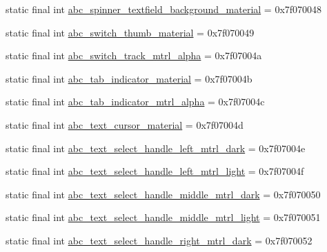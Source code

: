 \begin{DoxyCompactItemize}
static final int \mbox{\hyperlink{classandroid_1_1support_1_1design_1_1R_1_1drawable_a46a7523b2bf448075a84dea597735916}{abc\+\_\+spinner\+\_\+textfield\+\_\+background\+\_\+material}} = 0x7f070048
\item 
static final int \mbox{\hyperlink{classandroid_1_1support_1_1design_1_1R_1_1drawable_a3a7eda576b66b008b9973477103ad769}{abc\+\_\+switch\+\_\+thumb\+\_\+material}} = 0x7f070049
\item 
static final int \mbox{\hyperlink{classandroid_1_1support_1_1design_1_1R_1_1drawable_a2c00fcab8bac6c66dbe2d1a34992f941}{abc\+\_\+switch\+\_\+track\+\_\+mtrl\+\_\+alpha}} = 0x7f07004a
\item 
static final int \mbox{\hyperlink{classandroid_1_1support_1_1design_1_1R_1_1drawable_a1df6dff38e80904864f9d1b16188e4b0}{abc\+\_\+tab\+\_\+indicator\+\_\+material}} = 0x7f07004b
\item 
static final int \mbox{\hyperlink{classandroid_1_1support_1_1design_1_1R_1_1drawable_a7e95b663c60c56e55380a5750cbaf5e3}{abc\+\_\+tab\+\_\+indicator\+\_\+mtrl\+\_\+alpha}} = 0x7f07004c
\item 
static final int \mbox{\hyperlink{classandroid_1_1support_1_1design_1_1R_1_1drawable_ab7d0879432ccba232192251a071145bc}{abc\+\_\+text\+\_\+cursor\+\_\+material}} = 0x7f07004d
\item 
static final int \mbox{\hyperlink{classandroid_1_1support_1_1design_1_1R_1_1drawable_a3443ebe1b5b8906ed4c9677002c296d5}{abc\+\_\+text\+\_\+select\+\_\+handle\+\_\+left\+\_\+mtrl\+\_\+dark}} = 0x7f07004e
\item 
static final int \mbox{\hyperlink{classandroid_1_1support_1_1design_1_1R_1_1drawable_abf62ec497910e78f0b8f0f910c5336cc}{abc\+\_\+text\+\_\+select\+\_\+handle\+\_\+left\+\_\+mtrl\+\_\+light}} = 0x7f07004f
\item 
static final int \mbox{\hyperlink{classandroid_1_1support_1_1design_1_1R_1_1drawable_a9eab4bb52b1d5504fcd64d3c044bb384}{abc\+\_\+text\+\_\+select\+\_\+handle\+\_\+middle\+\_\+mtrl\+\_\+dark}} = 0x7f070050
\item 
static final int \mbox{\hyperlink{classandroid_1_1support_1_1design_1_1R_1_1drawable_a1a4f045c0995543f87ebdf598f654cc8}{abc\+\_\+text\+\_\+select\+\_\+handle\+\_\+middle\+\_\+mtrl\+\_\+light}} = 0x7f070051
\item 
static final int \mbox{\hyperlink{classandroid_1_1support_1_1design_1_1R_1_1drawable_a06ea64d6a64430f4efeb94307a7dff65}{abc\+\_\+text\+\_\+select\+\_\+handle\+\_\+right\+\_\+mtrl\+\_\+dark}} = 0x7f070052
\item 

\end{DoxyCompactItemize}
